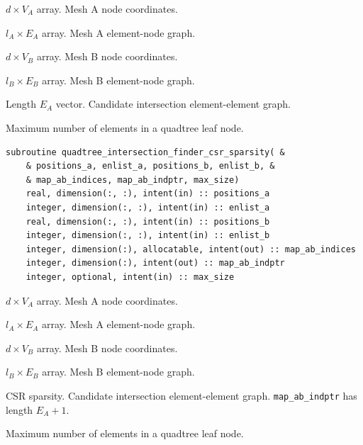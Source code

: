 \documentclass{article}
\begin{document}
\begin{description}[font=\ttfamily\bfseries,leftmargin=2.2\parindent,labelindent=1.7\parindent,noitemsep]
  \item[positions\_a] $d \times V_A$ array. Mesh A node coordinates.
  \item[enlist\_a] $l_A \times E_A$ array. Mesh A element-node graph.
  \item[positions\_b] $d \times V_B$ array. Mesh B node coordinates.
  \item[enlist\_b] $l_B \times E_B$ array. Mesh B element-node graph.
  \item[map\_ab] Length $E_A$ vector. Candidate intersection element-element
    graph.
  \item[max\_size] Maximum number of elements in a quadtree leaf node.
\end{description}
  
\begin{lstlisting}[language=FORTRAN]
  subroutine quadtree_intersection_finder_csr_sparsity( &
    & positions_a, enlist_a, positions_b, enlist_b, &
    & map_ab_indices, map_ab_indptr, max_size)
    real, dimension(:, :), intent(in) :: positions_a
    integer, dimension(:, :), intent(in) :: enlist_a
    real, dimension(:, :), intent(in) :: positions_b
    integer, dimension(:, :), intent(in) :: enlist_b
    integer, dimension(:), allocatable, intent(out) :: map_ab_indices
    integer, dimension(:), intent(out) :: map_ab_indptr
    integer, optional, intent(in) :: max_size
\end{lstlisting}

\begin{description}[font=\ttfamily\bfseries,leftmargin=2.2\parindent,labelindent=1.7\parindent,noitemsep]
  \item[positions\_a] $d \times V_A$ array. Mesh A node coordinates.
  \item[enlist\_a] $l_A \times E_A$ array. Mesh A element-node graph.
  \item[positions\_b] $d \times V_B$ array. Mesh B node coordinates.
  \item[enlist\_b] $l_B \times E_B$ array. Mesh B element-node graph.
  \item[map\_ab\_indices, map\_ab\_indptr] CSR sparsity. Candidate intersection
    element-element graph. \linebreak \verb+map_ab_indptr+ has length $E_A + 1$.
  \item[max\_size] Maximum number of elements in a quadtree leaf node.
\end{description}
\end{document}
